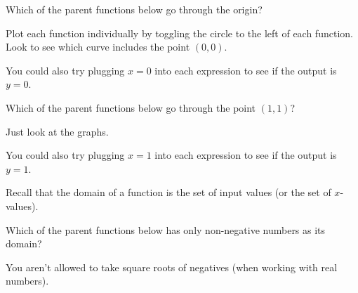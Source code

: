 \documentclass{ximera}
\begin{document}
\begin{question}
Which of the parent functions below go through the origin?

\begin{hint}
Plot each function individually by toggling the circle to the left of each function. Look to see which curve includes the point $(0,0)$.
\end{hint}
\begin{hint}
You could also try plugging $x=0$ into each expression to see if the output is $y=0$.
\end{hint}
\begin{multipleChoice}
\end{multipleChoice}

\end{question}

\begin{question}
Which of the parent functions below go through the point $(1,1)$?

\begin{hint}
Just look at the graphs.
\end{hint}
\begin{hint}
You could also try plugging $x=1$ into each expression to see if the output is $y=1$.
\end{hint}
\begin{multipleChoice}
\choice{All of them go through the point $(1,1)$.
\end{multipleChoice}

\end{question}

Recall that the domain of a function is the set of input values (or the set of $x$-values).

\begin{question}
Which of the parent functions below has only non-negative numbers as its domain?

\begin{hint}
You aren't allowed to take square roots of negatives (when working with real numbers).
\end{hint}
\begin{multipleChoice}
\end{multipleChoice}


\end{question}
\end{document}
